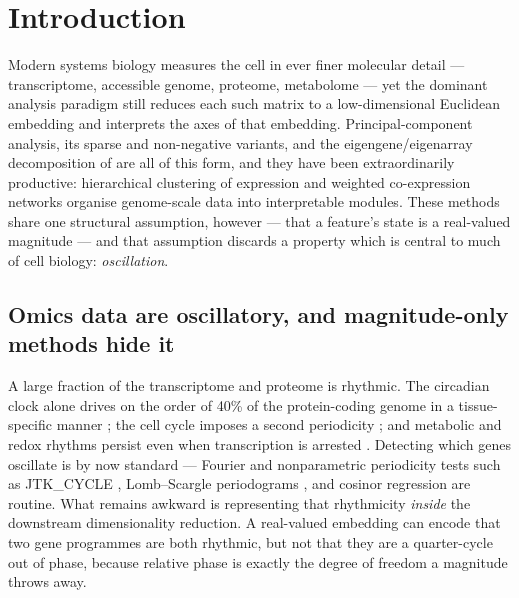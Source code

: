 \documentclass[preprint,12pt,amsmath,amssymb,superscriptaddress,floatfix]{revtex4-2}
\theoremstyle{definition}
\theoremstyle{plain}
\begin{document}

\maketitle

\section{Introduction}
\label{sec:intro}

Modern systems biology measures the cell in ever finer molecular detail ---
transcriptome, accessible genome, proteome, metabolome --- yet the dominant
analysis paradigm still reduces each such matrix to a low-dimensional Euclidean
embedding and interprets the axes of that embedding. Principal-component
analysis, its sparse and non-negative variants, and the eigengene/eigenarray
decomposition of \citet{alter2000svd} are all of this form, and they have been
extraordinarily productive: hierarchical clustering of expression
\citep{eisen1998cluster} and weighted co-expression networks
\citep{langfelder2008wgcna} organise genome-scale data into interpretable
modules. These methods share one structural assumption, however --- that a
feature's state is a real-valued magnitude --- and that assumption discards a
property which is central to much of cell biology: \emph{oscillation}.

\subsection{Omics data are oscillatory, and magnitude-only methods hide it}

A large fraction of the transcriptome and proteome is rhythmic. The circadian
clock alone drives on the order of 40\% of the protein-coding genome in a
tissue-specific manner \citep{zhang2014circadian, hughes2009harmonics}; the cell
cycle imposes a second periodicity \citep{spellman1998cellcycle}; and metabolic
and redox rhythms persist even when transcription is arrested
\citep{oneill2011circadian}. Detecting which genes oscillate is by now standard
--- Fourier and nonparametric periodicity tests such as JTK\_CYCLE
\citep{hughes2010jtk}, Lomb--Scargle periodograms \citep{vanderplas2018lombscargle},
and cosinor regression \citep{cornelissen2014cosinor} are routine. What remains
awkward is representing that rhythmicity \emph{inside} the downstream
dimensionality reduction. A real-valued embedding can encode that two gene
programmes are both rhythmic, but not that they are a quarter-cycle out of
phase, because relative phase is exactly the degree of freedom a magnitude
throws away.
\end{document}
